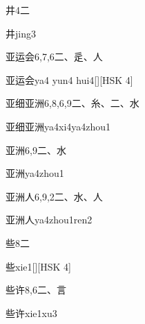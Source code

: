 \begin{entry}{井}{4}{⼆}
  \begin{phonetics}{井}{jing3}
  \end{phonetics}
\end{entry}

\begin{entry}{亚运会}{6,7,6}{⼆、⾡、⼈}
  \begin{phonetics}{亚运会}{ya4 yun4 hui4}[][HSK 4]
  \end{phonetics}
\end{entry}

\begin{entry}{亚细亚洲}{6,8,6,9}{⼆、⽷、⼆、⽔}
  \begin{phonetics}{亚细亚洲}{ya4xi4ya4zhou1}
  \end{phonetics}
\end{entry}

\begin{entry}{亚洲}{6,9}{⼆、⽔}
  \begin{phonetics}{亚洲}{ya4zhou1}
  \end{phonetics}
\end{entry}

\begin{entry}{亚洲人}{6,9,2}{⼆、⽔、⼈}
  \begin{phonetics}{亚洲人}{ya4zhou1ren2}
  \end{phonetics}
\end{entry}

\begin{entry}{些}{8}{⼆}
  \begin{phonetics}{些}{xie1}[][HSK 4]
  \end{phonetics}
\end{entry}

\begin{entry}{些许}{8,6}{⼆、⾔}
  \begin{phonetics}{些许}{xie1xu3}
  \end{phonetics}
\end{entry}


